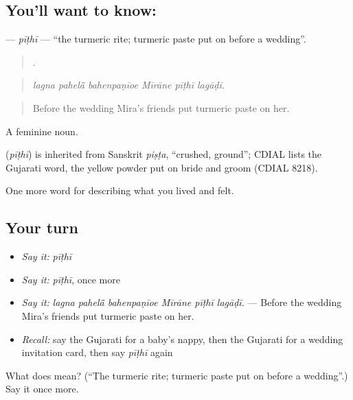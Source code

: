 \subsection*{You'll want to know: }
\textbf{} — \emph{pīṭhī} — \textquotedblleft{}the turmeric rite; turmeric paste put on before a wedding\textquotedblright{}.

\begin{quote}
     .
\end{quote}

\begin{quote}
\emph{lagna pahelā̃ bahenpaṇīoe Mīrāne pīṭhī lagāḍī.}
\end{quote}

\begin{quote}
Before the wedding Mira's friends put turmeric paste on her.
\end{quote}

A feminine noun.

\begin{cousinweb}
\textbf{} (\emph{pīṭhī}) is inherited from Sanskrit \emph{piṣṭa}, \textquotedblleft{}crushed, ground\textquotedblright{}; CDIAL lists the Gujarati word, the yellow powder put on bride and groom (CDIAL 8218).
\end{cousinweb}

\begin{grammarlens}[title={What you've built}]
One more word for describing what you lived and felt.
\end{grammarlens}

\subsection*{Your turn}
\begin{itemize}
\raggedright
  \item \emph{Say it:} \emph{pīṭhī}
  \item \emph{Say it:} \emph{pīṭhī}, once more
  \item \emph{Say it:} \emph{lagna pahelā̃ bahenpaṇīoe Mīrāne pīṭhī lagāḍī.} — Before the wedding Mira's friends put turmeric paste on her.
  \item \emph{Recall:} say the Gujarati for a baby's nappy, then the Gujarati for a wedding invitation card, then say \emph{pīṭhī} again
\end{itemize}

\begin{tcolorbox}[breakable,colback=teal!4,colframe=teal!35!black,title={Before you move on}]
What does  mean? (\textquotedblleft{}The turmeric rite; turmeric paste put on before a wedding\textquotedblright{}.) Say it once more.
\end{tcolorbox}
